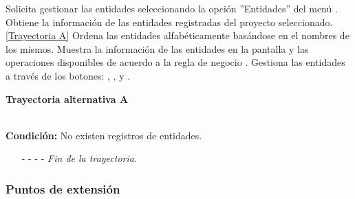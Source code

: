 \begin{UCtrayectoria}
	\UCpaso[\UCactor] Solicita gestionar las entidades seleccionando la opción ''Entidades'' del menú .
	\UCpaso[\UCsist] Obtiene la información de las entidades registradas del proyecto seleccionado. \hyperlink{CU7:TAA}{[Trayectoria A]}
	\UCpaso[\UCsist] Ordena las entidades alfabéticamente basándose en el nombres de los mismos.
	\UCpaso[\UCsist] Muestra la información de las entidades en la pantalla  y las operaciones disponibles de acuerdo a la regla de negocio . \label{CU7-P4}
	\UCpaso[\UCactor] Gestiona las entidades a través de los botones: , \editar , \eliminar y . 
\end{UCtrayectoria}		
\hypertarget{CU7:TAA}{\textbf{Trayectoria alternativa A}}\\
\noindent \textbf{Condición:} No existen registros de entidades.
\begin{enumerate}
	\UCpaso[\UCsist] Muestra el mensaje  en la pantalla  para indicar que no hay registros de entidades para mostrar.  \label{CU7-TA1}
	\UCpaso[\UCactor] Gestiona las entidades a través del botón: . 
	\item[- -] - - {\em {Fin de la trayectoria}}.%
\end{enumerate}

\subsubsection{Puntos de extensión}

